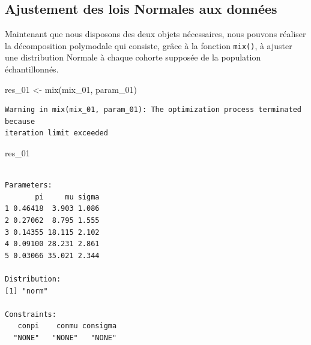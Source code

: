 \documentclass[
  a4paper,
  DIV=11,
  numbers=noendperiod,
  oneside]{scrreprt}
\newenvironment{Shaded}{}{}
\newcommand{\FunctionTok}[1]{\textcolor[rgb]{0.44,0.26,0.76}{#1}}
\newcommand{\NormalTok}[1]{\textcolor[rgb]{0.14,0.16,0.18}{#1}}
\newcommand{\OtherTok}[1]{\textcolor[rgb]{0.44,0.26,0.76}{#1}}
\begin{document}
\hypertarget{ajustement-des-lois-normales-aux-donnuxe9es}{%
\subsection{Ajustement des lois Normales aux
données}\label{ajustement-des-lois-normales-aux-donnuxe9es}}

Maintenant que nous disposons des deux objets nécessaires, nous pouvons
réaliser la décomposition polymodale qui consiste, grâce à la fonction
\texttt{mix()}, à ajuster une distribution Normale à chaque cohorte
supposée de la population échantillonnés.

\begin{Shaded}
\begin{Highlighting}[]
\NormalTok{res\_01 }\OtherTok{\textless{}{-}} \FunctionTok{mix}\NormalTok{(mix\_01, param\_01)}
\end{Highlighting}
\end{Shaded}

\begin{verbatim}
Warning in mix(mix_01, param_01): The optimization process terminated because
iteration limit exceeded
\end{verbatim}

\begin{Shaded}
\begin{Highlighting}[]
\NormalTok{res\_01}
\end{Highlighting}
\end{Shaded}

\begin{verbatim}

Parameters:
       pi     mu sigma
1 0.46418  3.903 1.086
2 0.27062  8.795 1.555
3 0.14355 18.115 2.102
4 0.09100 28.231 2.861
5 0.03066 35.021 2.344

Distribution:
[1] "norm"

Constraints:
   conpi    conmu consigma 
  "NONE"   "NONE"   "NONE" 
\end{verbatim}

\end{document}

